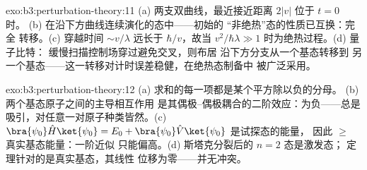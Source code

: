 \begin{solution}{exo:b3:perturbation-theory:11}
(a) 两支双曲线，最近接近距离 $2|v|$ 位于 $t = 0$ 时。
(b) 在沿下方曲线连续演化的态中——初始的
“非绝热”态的性质已互换：完全
转移。(c) 穿越时间 $\sim v/\lambda$ 远长于
$\hbar/v$，故当 $v^2/\hbar\lambda \gg 1$ 时为绝热过程。(d) 量子比特：
缓慢扫描控制场穿过避免交叉，则布居
沿下方分支从一个基态转移到
另一个基态——这一转移对计时误差稳健，在绝热态制备中
被广泛采用。
\end{solution}

\begin{solution}{exo:b3:perturbation-theory:12}
(a) 求和的每一项都是某个平方除以负的分母。
(b) 两个基态原子之间的主导相互作用
是其偶极–偶极耦合的二阶效应：为负——总是
吸引，对任意一对原子种类皆然。(c) $\bra{\psi_0}\hat H\ket{
\psi_0} = E_0 + \bra{\psi_0}\hat V\ket{\psi_0}$ 是试探态的能量，
因此 $\ge$ 真实基态能量：一阶近似
只能偏高。(d) 斯塔克分裂后的 $n = 2$ 态是激发态；
定理针对的是真实基态，其线性
位移为零——并无冲突。
\end{solution}

